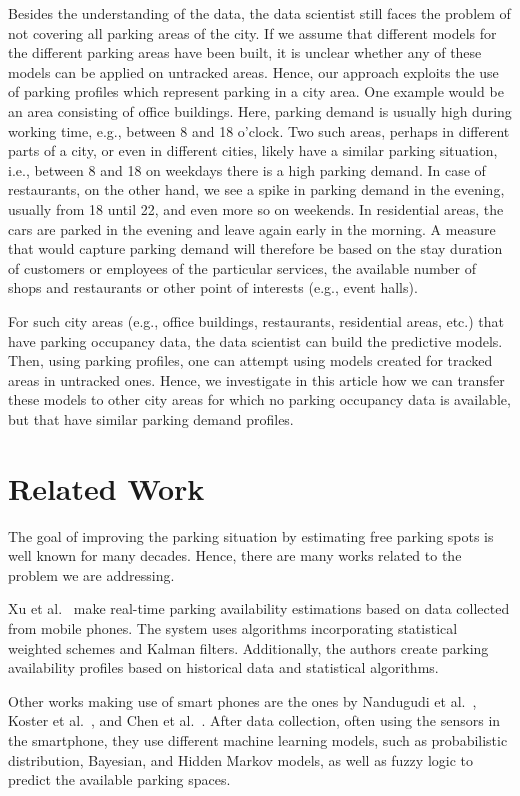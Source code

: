 Besides the understanding of the data, the data scientist still faces the problem of not covering all parking areas of the city. 
If we assume that different models for the different parking areas have been built, it is unclear whether any of these models can be applied on untracked areas. 
Hence, our approach exploits the use of parking profiles which represent parking in a city area. One example would be an area consisting of office buildings. Here, parking demand is usually high during working time, e.g., between 8 and 18 o'clock. Two such areas, perhaps in different parts of a city, or even in different cities, likely have a similar parking situation, i.e., between 8 and 18 on weekdays there is a high parking demand. In case of restaurants, on the other hand, we see a spike in parking demand in the evening, usually from 18 until 22, and even more so on weekends. In residential areas, the cars are parked in the evening and leave again early in the morning. A measure that would capture parking demand will therefore be based on the stay duration of customers or employees of the particular services, the available number of shops and restaurants or other point of interests (e.g., event halls). 

For such city areas (e.g., office buildings, restaurants, residential areas, etc.) that have parking occupancy data, the data scientist can build the predictive models. 
Then, using parking profiles, one can attempt using models created for tracked areas in untracked ones. 
Hence, we investigate in this article how we can transfer these models to other city areas for which no parking occupancy data is available, but that have similar parking demand profiles. 

\section{Related Work}
\label{sec:relwork}
The goal of improving the parking situation by estimating free parking spots is well known for many decades. 
Hence, there are many works related to the problem we are addressing.

Xu et al.~\cite{xu} make real-time parking availability estimations based on data collected from mobile phones. The system uses algorithms incorporating statistical weighted schemes and Kalman filters. Additionally, the authors create parking availability profiles based on historical data and statistical algorithms.

Other works making use of smart phones are the ones by Nandugudi et al.~\cite{nandugudi}, Koster et al.~\cite{koster}, and Chen et al.~\cite{zchen}.
After data collection, often using the sensors in the smartphone, they use different machine learning models, such as probabilistic distribution, Bayesian, and Hidden Markov models, as well as fuzzy logic to predict the available parking spaces.

